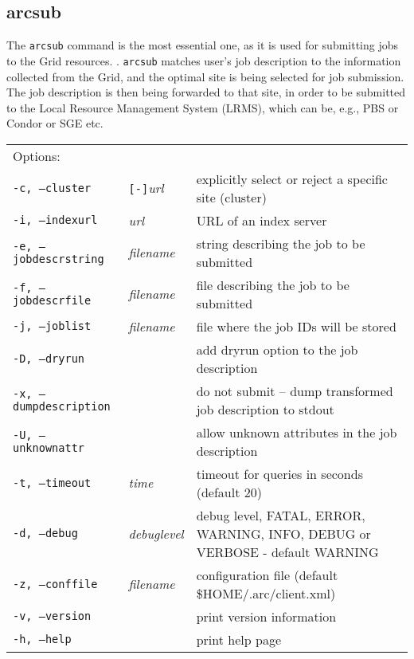 \subsection{arcsub}\label{sec:arcsub}
The \texttt{arcsub} command is the
most essential one, as it is used for submitting jobs to the Grid
resources. . \texttt{arcsub} matches user's job
description to the information collected from the Grid, and the
optimal site is being selected for job submission. The job description
is then being forwarded to that site, in order to be submitted to the
Local Resource Management System (LRMS), which can be, e.g., PBS or
Condor or SGE etc.

\hspace*{0.5cm}
\begin{shaded}
\end{shaded}
\begin{longtable}{llp{8cm}}
   Options:&&\\
   \texttt{-c, --cluster}&\verb#[-]#\textit{url}&explicitly select or reject a specific site (cluster)\\
   \texttt{-i, --indexurl}&\textit{url}&URL of an index server\\
   \texttt{-e, --jobdescrstring}&\textit{filename}&string describing the job to be submitted\\
   \texttt{-f, --jobdescrfile}&\textit{filename}&file describing the job to be submitted\\
   \texttt{-j, --joblist}&\textit{filename}&file where the job IDs will be stored\\
   \texttt{-D, --dryrun}&&add dryrun option to the job description\\
   \texttt{-x, --dumpdescription}&&do not submit -- dump transformed job description to stdout\\
   \texttt{-U, --unknownattr}&&allow unknown attributes in the job description\\
   \texttt{-t, --timeout}&\textit{time}&timeout for queries in seconds (default 20)\\
   \texttt{-d, --debug}&\textit{debuglevel}&debug level, FATAL, ERROR, WARNING, INFO, DEBUG or VERBOSE - default WARNING\\
   \texttt{-z, --conffile}&\textit{filename}& configuration file (default {\$}HOME/.arc/client.xml)\\
   \texttt{-v, --version}&&print version information\\
   \texttt{-h, --help}&&print help page\\
\end{longtable}




